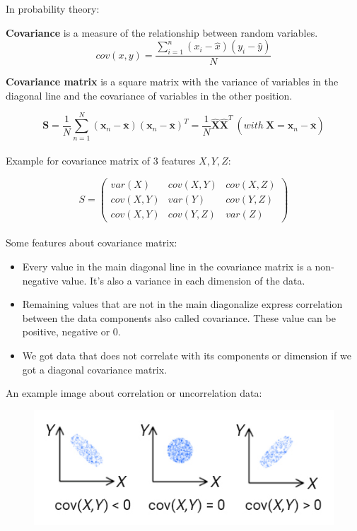 \documentclass[a4paper, 12pt]{report}
\begin{document}
\indent \par In probability theory:

\textbf{Covariance} is a measure of the relationship between random variables. 
$$cov(x,y) = \frac{\sum_{i=1}^{n} (x_i - \hat{x})(y_i - \hat{y})}{N}$$

\textbf{Covariance matrix} is a square matrix with the variance of variables in the diagonal line and the covariance of variables in the other position.

\begin{equation*}
    \mathbf{S} =  \frac{1}{N}\sum_{n=1}^N (\mathbf{x}_n - \bar{\mathbf{x}})(\mathbf{x}_n - \bar{\mathbf{x}})^T = \frac{1}{N}\hat{\mathbf{X}}\hat{\mathbf{X}}^T ~(with~ \hat{\mathbf{X}}=\mathbf{x}_n - \bar{\mathbf{x}})
\end{equation*}\\

\indent Example for covariance matrix of 3 features $X,Y,Z$:

\begin{equation*}
S = \begin{pmatrix} 
var(X) & cov(X,Y) & cov(X,Z)\\
cov(X,Y) & var(Y) & cov(Y,Z)\\ 
cov(X,Y) & cov(Y,Z) & var(Z) 
\end{pmatrix}
\end{equation*}\\
\indent Some features about covariance matrix:
\begin{itemize}
\item Every value in the main diagonal line in the covariance matrix is a non-negative value. It's also a variance in each dimension of the data.
\item Remaining values that are not in the main diagonalize express correlation between the data components also called covariance. These value can be positive, negative or 0.
\item We got data that does not correlate with its components or dimension if we got a diagonal covariance matrix.
\end{itemize}

An example image about correlation or uncorrelation data:
\begin{figure}[H]
    \center
    \includegraphics[scale=3]{covx-y.jpg}
\end{figure}
\end{document}
